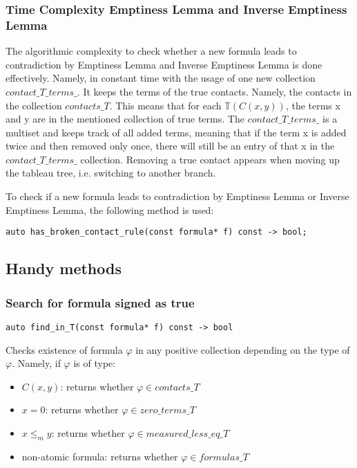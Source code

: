 \documentclass{article}
\begin{document}
	\subsubsection*{Time Complexity Emptiness Lemma and Inverse Emptiness Lemma}
	The algorithmic complexity to check whether a new formula leads to contradiction by Emptiness Lemma and Inverse Emptiness Lemma is done effectively. Namely, in constant time with the usage of one new collection $contact\_T\_terms\_$. It keeps the terms of the true contacts. Namely, the contacts in the collection $contacts\_T$. This means that for each $\mathbb{T}(C(x, y))$, the terms x and y are in the mentioned collection of true terms. The $contact\_T\_terms\_$  is a multiset and keeps track of all added terms, meaning that if the term x is added twice and then removed only once, there will still be an entry of that x in the $contact\_T\_terms\_$ collection. Removing a true contact appears when moving up the tableau tree, i.e. switching to another branch.

	To check if a new formula leads to contradiction by Emptiness Lemma or Inverse Emptiness Lemma, the following method is used:
\begin{lstlisting}
auto has_broken_contact_rule(const formula* f) const -> bool;
\end{lstlisting}

	\subsection{Handy methods}
	\subsubsection*{Search for formula signed as true}
\begin{lstlisting}
auto find_in_T(const formula* f) const -> bool
\end{lstlisting}
	Checks existence of formula $\varphi$ in any positive collection depending on the type of $\varphi$. Namely, if $\varphi$ is of type:
	\begin{itemize}
		\item $C(x, y)$: returns whether $\varphi \in contacts\_T$
		\item $x = 0$: returns whether $\varphi \in zero\_terms\_T$
		\item $x \le_m y$: returns whether $\varphi \in measured\_less\_eq\_T$
		\item non-atomic formula: returns whether $\varphi \in formulas\_T$
	\end{itemize}
\end{document}
